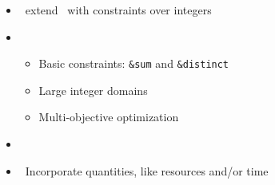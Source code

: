 \begin{frame}{\clingcon}
  \begin{itemize}
  \item {} \ extend \clingo\ with constraints over integers
  \item {} \
    \begin{itemize}
    \item Basic constraints: \lstinline{&sum} and \lstinline{&distinct}
    \item Large integer domains
    \item Multi-objective optimization
    \end{itemize}
  \item {} \ \cite{bakaossc16a}
  \item {} \ Incorporate quantities, like resources and/or time
  \end{itemize}
\end{frame}
%
